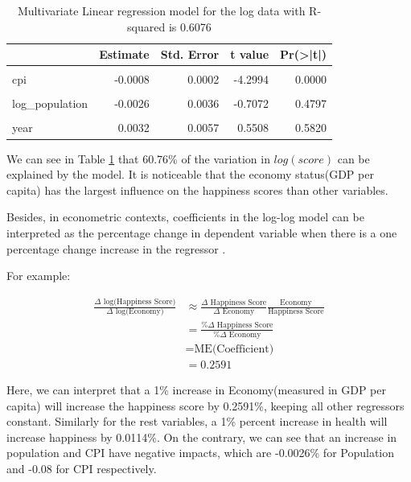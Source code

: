\documentclass[11pt,a4paper,]{article}
\begin{document}
\begin{table}

\caption{\label{tab:mle}Multivariate Linear regression model for the log data with R-squared is 0.6076}
\centering
\begin{tabular}[t]{l|r|r|r|r}
\hline
  & Estimate & Std. Error & t value & Pr(>|t|)\\
\hline
\cellcolor{gray!6}{(Intercept)} & \cellcolor{gray!6}{-4.5999} & \cellcolor{gray!6}{11.5632} & \cellcolor{gray!6}{-0.3978} & \cellcolor{gray!6}{0.6909}\\
\hline
cpi & -0.0008 & 0.0002 & -4.2994 & 0.0000\\
\hline
\cellcolor{gray!6}{log\_eco} & \cellcolor{gray!6}{0.2591} & \cellcolor{gray!6}{0.0094} & \cellcolor{gray!6}{27.5487} & \cellcolor{gray!6}{0.0000}\\
\hline
log\_population & -0.0026 & 0.0036 & -0.7072 & 0.4797\\
\hline
\cellcolor{gray!6}{log\_health} & \cellcolor{gray!6}{0.0114} & \cellcolor{gray!6}{0.0042} & \cellcolor{gray!6}{2.7419} & \cellcolor{gray!6}{0.0063}\\
\hline
year & 0.0032 & 0.0057 & 0.5508 & 0.5820\\
\hline
\end{tabular}
\end{table}

We can see in Table \ref{tab:mle} that 60.76\% of the variation in \(log(score)\) can be explained by the model. It is noticeable that the economy status(GDP per capita) has the largest influence on the happiness scores than other variables.

Besides, in econometric contexts, coefficients in the log-log model can be interpreted as the percentage change in dependent variable when there is a one percentage change increase in the regressor \autocite{benoit2011}.

For example:

\begin{align*}
\frac{\Delta \text{ log(Happiness Score)}}{\Delta \text{ log(Economy)}} &\approx \frac{\Delta \text{ Happiness Score}}{\Delta \text{ Economy} }\frac{\text{Economy}}{\text{Happiness Score}}\\
&=\frac{\% \Delta \text{ Happiness Score}}{\% \Delta \text{ Economy}} \nonumber\\
&= \text{ME(Coefficient)}\nonumber\\
&= 0.2591
\end{align*}

Here, we can interpret that a 1\% increase in Economy(measured in GDP per capita) will increase the happiness score by 0.2591\%, keeping all other regressors constant. Similarly for the rest variables, a 1\% percent increase in health will increase happiness by 0.0114\%. On the contrary, we can see that an increase in population and CPI have negative impacts, which are -0.0026\% for Population and -0.08 for CPI respectively.
\end{document}
